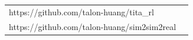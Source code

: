 
\begin{tabular}{ll}  https://github.com/talon-huang/tita\_rl\\
	https://github.com/talon-huang/sim2sim2real
\end{tabular}

